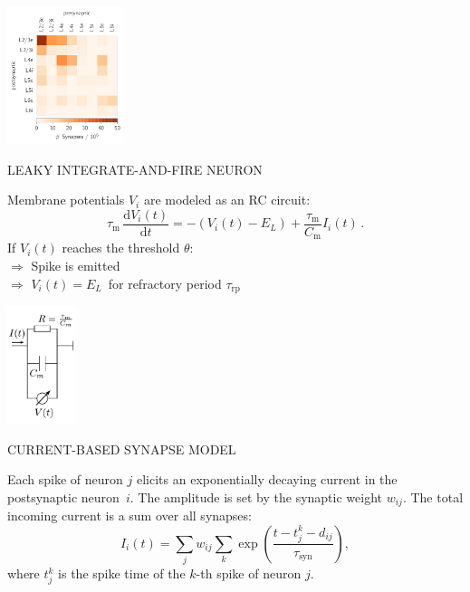 \documentclass[portrait, final, a0paper, fontscale=0.34, leqno]{baposter}
\begin{document}
\begin{poster}
{\begin{multicols}{3}
        \includegraphics[height=4.0cm]{synapse_numbers} 
    \end{multicols} 

    \centerline{\uppercase{Leaky integrate-and-fire neuron}}
    \vspace{0.2cm}
    \begin{vwcol}[widths={0.75, 0.3},
            sep=.4cm, rule=0pt, indent=0em] 
    \setcounter{equation}{0}
    Membrane potentials $V_i$ are modeled as an RC circuit:
        \begin{equation}
            \tau_\text{m} \,\frac{\text{d} V_i(t)}{\text{d} t} 
            = - (V_i(t) - E_L) + \frac{\tau_\text{m}}{C_\text{m}} I_i(t) \,.
            \label{eq:lif-neuron}
        \end{equation}
        If $V_i(t)$ reaches the threshold $\theta$: \\
        \vspace{0.2cm}
            \quad $\Rightarrow$ 
                Spike is emitted \\
        \vspace{0.2cm}
            \quad $\Rightarrow$ 
                $V_i(t) = E_L$ \,for refractory period $\tau_\text{rp}$ 

    \includegraphics[width=2cm]{RC_circuit}

    \end{vwcol} 

    \vspace{0.5cm}
    \centerline{\uppercase{Current-based synapse model}}
    \vspace{0.3cm}
    Each spike of neuron $j$ elicits an exponentially decaying current in the
    postsynaptic neuron~$i$.  
    The amplitude is set by the synaptic weight $w_{ij}$. 
    The total incoming current is a sum over all synapses:
    \begin{equation}
        I_i(t) = 
            \sum_j w_{ij} \sum_k 
            \exp\left(\frac{t - t_j^k - d_{ij}}{\tau_\text{syn}}\right) ,
        \label{eq:input_current}
    \end{equation}
    where $t^k_j$ is the spike time of the $k$-th spike of neuron $j$.
}



\end{poster}
\end{document}
